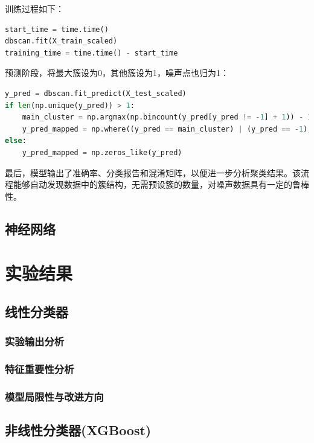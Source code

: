 \documentclass{SYSUReport}
\begin{document}
训练过程如下：

\begin{lstlisting}[language=Python]
start_time = time.time()
dbscan.fit(X_train_scaled)
training_time = time.time() - start_time
\end{lstlisting}

预测阶段，将最大簇设为0，其他簇设为1，噪声点也归为1：

\begin{lstlisting}[language=Python]
y_pred = dbscan.fit_predict(X_test_scaled)
if len(np.unique(y_pred)) > 1:
    main_cluster = np.argmax(np.bincount(y_pred[y_pred != -1] + 1)) - 1
    y_pred_mapped = np.where((y_pred == main_cluster) | (y_pred == -1), 0, 1)
else:
    y_pred_mapped = np.zeros_like(y_pred)
\end{lstlisting}

最后，模型输出了准确率、分类报告和混淆矩阵，以便进一步分析聚类结果。该流程能够自动发现数据中的簇结构，无需预设簇的数量，对噪声数据具有一定的鲁棒性。

\subsection{神经网络}

\section{实验结果}

\subsection{线性分类器}
\subsubsection{实验输出分析}
\subsubsection{特征重要性分析}
\subsubsection{模型局限性与改进方向}

\subsection{非线性分类器(XGBoost)}
\end{document}
